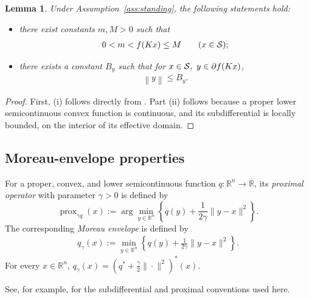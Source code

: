 \documentclass[9pt]{article}
\numberwithin{equation}{section}
\newtheorem{lemma}[theorem]{Lemma}
\theoremstyle{definition}
\theoremstyle{remark}
\newcommand{\norm}[1]{\left\lVert #1\right\rVert}
\DeclareMathOperator{\prox}{prox}
\begin{document}
\begin{lemma}
\label{lem:denominator-bounds}
Under Assumption~\ref{ass:standing}, the following
statements hold:
\begin{itemize}
\item[(i)] there exist constants $m,M>0$ such
that
\begin{eqnarray}\label{eq:mM}
    0<m< f(Kx)\leq M
    \qquad(x\in {\cal S});
\end{eqnarray}
\item[(ii)] there exists a constant $B_{y}$ such that
for $x\in {\cal S},\ y\in\partial f(Kx)$,
\begin{eqnarray}\label{eq:y-uniform}
    \norm y\leq B_{y}.\end{eqnarray}
    \end{itemize}
\end{lemma}
\begin{proof} First, (i) follows directly from \cite[Lemma 3.5]{
BotLiTao2025}. Part (ii) follows because a proper lower
semicontinuous convex function is continuous, and its subdifferential is
locally bounded, on the interior of its effective domain.
\end{proof}


\subsection{\texorpdfstring{Moreau-envelope properties}{Moreau-envelope properties}}
For a proper, convex, and lower semicontinuous function
\(q:\mathbb{R}^n\to\overline{\mathbb{R}}\), its \emph{proximal operator}
with parameter \(\gamma>0\) is defined by
$$
\prox_{\gamma q}(x)
:=
\arg\min_{y\in\mathbb{R}^n}
\left\{
q(y)+\frac{1}{2\gamma}\|y-x\|^2
\right\}.
$$
The corresponding \emph{Moreau envelope} is defined by
\begin{eqnarray}\label{fgamma}
q_\gamma(x)
:=
\min_{y\in\mathbb{R}^n}
\left\{
q(y)+\frac{1}{2\gamma}\|y-x\|^2
\right\}.
\end{eqnarray}
For every \(x\in\mathbb{R}^n\),
$
q_\gamma(x)
=
\left(q^*+\frac{\gamma}{2}\|\cdot\|^2\right)^*(x).
$


See, for example, \cite{RockafellarWets1998,BauschkeCombettes2017} for the
subdifferential and proximal conventions used here.
\end{document}
